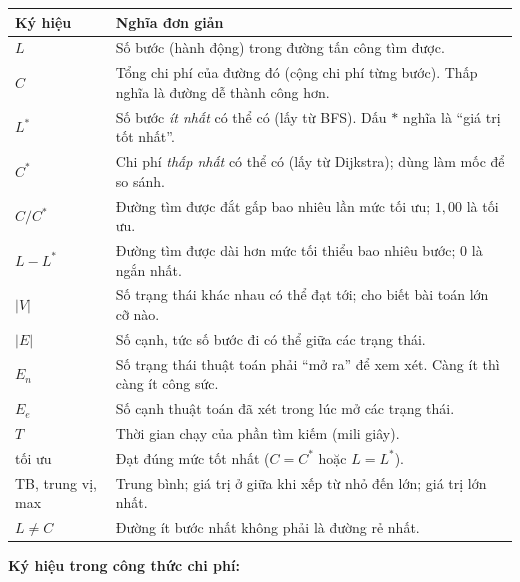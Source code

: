 \documentclass[11pt,a4paper]{article}
\newcommand{\Cs}{C^{*}}
\newcommand{\Ls}{L^{*}}
\newcommand{\V}{|V|}
\newcommand{\E}{|E|}
\begin{document}
\begin{center}\small
\begin{tabular}{@{}Y{2.6cm}Y{13.2cm}@{}}
\toprule
Ký hiệu & Nghĩa đơn giản \\
\midrule
$L$ & Số bước (hành động) trong đường tấn công tìm được. \\
$C$ & Tổng chi phí của đường đó (cộng chi phí từng bước). Thấp nghĩa là đường dễ thành công hơn. \\
$\Ls$ & Số bước \emph{ít nhất} có thể có (lấy từ BFS). Dấu $*$ nghĩa là ``giá trị tốt nhất''. \\
$\Cs$ & Chi phí \emph{thấp nhất} có thể có (lấy từ Dijkstra); dùng làm mốc để so sánh. \\
$C/\Cs$ & Đường tìm được đắt gấp bao nhiêu lần mức tối ưu; $1{,}00$ là tối ưu. \\
$L-\Ls$ & Đường tìm được dài hơn mức tối thiểu bao nhiêu bước; $0$ là ngắn nhất. \\
$\V$ & Số trạng thái khác nhau có thể đạt tới; cho biết bài toán lớn cỡ nào. \\
$\E$ & Số cạnh, tức số bước đi có thể giữa các trạng thái. \\
$E_n$ & Số trạng thái thuật toán phải ``mở ra'' để xem xét. Càng ít thì càng ít công sức. \\
$E_e$ & Số cạnh thuật toán đã xét trong lúc mở các trạng thái. \\
$T$ & Thời gian chạy của phần tìm kiếm (mili giây). \\
tối ưu & Đạt đúng mức tốt nhất ($C=\Cs$ hoặc $L=\Ls$). \\
TB, trung vị, max & Trung bình; giá trị ở giữa khi xếp từ nhỏ đến lớn; giá trị lớn nhất. \\
$L\neq C$ & Đường ít bước nhất không phải là đường rẻ nhất. \\
\bottomrule
\end{tabular}
\end{center}

\textbf{Ký hiệu trong công thức chi phí:}
\end{document}
